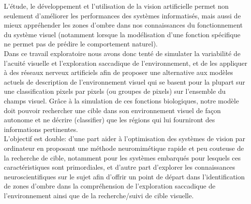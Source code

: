 L'étude, le développement et l'utilisation de la vision artificielle permet non seulement d'améliorer les performances des systèmes informatisés, mais aussi de mieux appréhender les zones d'ombre dans nos connaissances du fonctionnement du système visuel (notamment lorsque la modélisation d'une fonction spécifique ne permet pas de prédire le comportement naturel). \autocite{Werner2014, Zhaoping2014} \\

Dans ce travail exploratoire nous avons donc tenté de simulater la variabilité de l'acuité visuelle et l'exploration saccadique de l'environnement, et de les appliquer à des réseaux nerveux artificiels afin de proposer une alternative aux modèles actuels de description de l'environnement visuel qui se basent pour la plupart sur une classification pixels par pixels (ou groupes de pixels) sur l'ensemble du champs visuel. 
Grâce à la simulation de ces fonctions biologiques, notre modèle doit pouvoir rechercher une cible dans son environnement visuel de façon autonome et ne décrire (classifier) que les régions qui lui fourniront des informations pertinentes. \\
L'objectif est double: d'une part aider à l'optimisation des systèmes de vision par ordinateur en proposant une méthode neuromimétique rapide et peu couteuse de la recherche de cible, notamment pour les systèmes embarqués pour lesquels ces caractéristiques sont primordiales, et d'autre part d'explorer les connaissances neuroscientifiques sur le sujet afin d'offrir un point de départ dans l'identification de zones d'ombre dans la compréhension de l'exploration saccadique de l'environnement ainsi que de la recherche/suivi de cible visuelle.